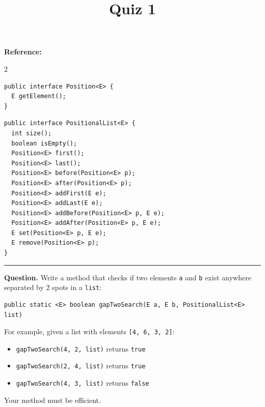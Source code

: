 \documentclass{article}
\title{Quiz 1}
\author{}
\date{}
\begin{document}
\maketitle

\noindent\textbf{Reference:}
\vspace{-0.5em}
\begin{multicols}{2}
\begin{lstlisting}
public interface Position<E> {
  E getElement();
}
\end{lstlisting}
\columnbreak
\begin{lstlisting}
public interface PositionalList<E> {
  int size();
  boolean isEmpty();
  Position<E> first();
  Position<E> last();
  Position<E> before(Position<E> p);
  Position<E> after(Position<E> p);
  Position<E> addFirst(E e);
  Position<E> addLast(E e);
  Position<E> addBefore(Position<E> p, E e);
  Position<E> addAfter(Position<E> p, E e);
  E set(Position<E> p, E e);
  E remove(Position<E> p);
}
\end{lstlisting}
\end{multicols}

\noindent\rule{\textwidth}{0.4pt}

\bigskip

\noindent\textbf{Question.}
Write a method that checks if two elements \texttt{a} and \texttt{b} exist anywhere separated by 2 spots in a \texttt{list}:

\begin{lstlisting}
public static <E> boolean gapTwoSearch(E a, E b, PositionalList<E> list)
\end{lstlisting}

\noindent For example, given a list with elements \texttt{[4, 6, 3, 2]}:
\begin{itemize}
  \item \texttt{gapTwoSearch(4, 2, list)} returns \texttt{true}
  \item \texttt{gapTwoSearch(2, 4, list)} returns \texttt{true}
  \item \texttt{gapTwoSearch(4, 3, list)} returns \texttt{false}
\end{itemize}

\noindent Your method must be efficient.

\newpage
\end{document}
